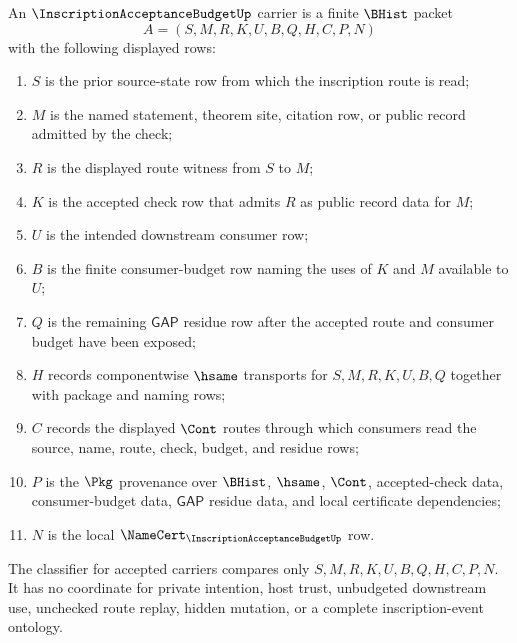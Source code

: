 \begin{definition}
\label{def:inscription-acceptance-budget-carrier}
An $\InscriptionAcceptanceBudgetUp$ carrier is a finite $\BHist$ packet
$$
A=(S,M,R,K,U,B,Q,H,C,P,N)
$$
with the following displayed rows:
\begin{enumerate}
\item $S$ is the prior source-state row from which the inscription route is read;
\item $M$ is the named statement, theorem site, citation row, or public record admitted by the check;
\item $R$ is the displayed route witness from $S$ to $M$;
\item $K$ is the accepted check row that admits $R$ as public record data for $M$;
\item $U$ is the intended downstream consumer row;
\item $B$ is the finite consumer-budget row naming the uses of $K$ and $M$ available to $U$;
\item $Q$ is the remaining $\mathsf{GAP}$ residue row after the accepted route and consumer budget have been exposed;
\item $H$ records componentwise $\hsame$ transports for $S,M,R,K,U,B,Q$ together with package and naming rows;
\item $C$ records the displayed $\Cont$ routes through which consumers read the source, name, route, check, budget, and residue rows;
\item $P$ is the $\Pkg$ provenance over $\BHist$, $\hsame$, $\Cont$, accepted-check data, consumer-budget data, $\mathsf{GAP}$ residue data, and local certificate dependencies;
\item $N$ is the local $\NameCert_{\InscriptionAcceptanceBudgetUp}$ row.
\end{enumerate}
The classifier for accepted carriers compares only $S,M,R,K,U,B,Q,H,C,P,N$. It has no coordinate for private intention, host trust, unbudgeted downstream use, unchecked route replay, hidden mutation, or a complete inscription-event ontology.
\end{definition}

